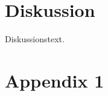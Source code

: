 \documentclass{aplreport}
\begin{document}
\section{Diskussion}
\label{sec:diskussion}

Diskussionstext.




\makeappendix

\section{Appendix 1}
\label{sec:appendix1}
\end{document}
